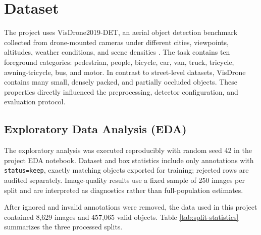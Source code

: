 \providecommand{\reportfigdir}{docs/figures}

\section{Dataset}
\label{sec:dataset}

The project uses VisDrone2019-DET, an aerial object detection benchmark
collected from drone-mounted cameras under different cities, viewpoints,
altitudes, weather conditions, and scene densities \cite{zhu2018vision,du2019visdrone}.
The task contains ten foreground categories: pedestrian, people, bicycle, car,
van, truck, tricycle, awning-tricycle, bus, and motor. In contrast to
street-level datasets, VisDrone contains many small, densely packed, and
partially occluded objects. These properties directly influenced the
preprocessing, detector configuration, and evaluation protocol.

\subsection{Exploratory Data Analysis (EDA)}
\label{subsec:dataset-insight}

The exploratory analysis was executed reproducibly with random seed 42 in the
project EDA notebook. Dataset and box statistics include only annotations with
\texttt{status=keep}, exactly matching objects exported for training; rejected
rows are audited separately. Image-quality results use a fixed sample of 250
images per split and are interpreted as diagnostics rather than full-population
estimates.

After ignored and invalid annotations were removed, the data used in this
project contained 8,629 images and 457,065 valid objects. Table
\ref{tab:split-statistics} summarizes the three processed splits.

\begin{table}[htbp]
  \centering
  \caption{VisDrone split statistics after preprocessing.}
  \label{tab:split-statistics}
\end{table}

